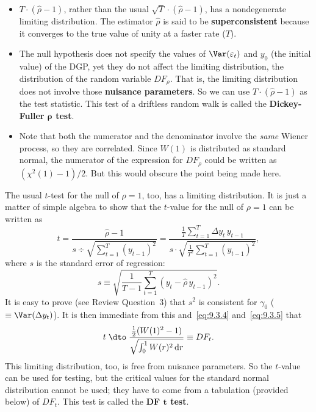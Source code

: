\begin{itemize}
\item $T \cdot (\hat{\rho} - 1)$, rather than the usual $\sqrt{T} \cdot (\hat{\rho} - 1)$, has a nondegenerate limiting
distribution. The estimator $\hat{\rho}$ is said to be \textbf{superconsistent} because it converges
to the true value of unity at a faster rate ($T$).

\item The null hypothesis does not specify the values of $\Var(\varepsilon_t)$ and $y_0$ (the initial
value) of the DGP, yet they do not affect the limiting distribution, the distribution
of the random variable $DF_\rho$. That is, the limiting distribution does not involve
those \textbf{nuisance parameters}. So we can use $T \cdot (\hat{\rho} - 1)$ as the test statistic. This
test of a driftless random walk is called the \textbf{Dickey-Fuller $\bm{\rho}$ test}.

\item Note that both the numerator and the denominator involve the \emph{same} Wiener
process, so they are correlated. Since $W(1)$ is distributed as standard normal,
the numerator of the expression for $DF_\rho$ could be written as $(\chi^2(1) - 1)/2$. But
this would obscure the point being made here.
\end{itemize}

The usual $t$-test for the null of $\rho = 1$, too, has a limiting distribution. It is just
a matter of simple algebra to show that the $t$-value for the null of $\rho = 1$ can be
written as
\begin{equation}
\label{eq:9.3.7}
t = \frac{\hat{\rho} - 1}{s \div \sqrt{\sum_{t=1}^{T} (y_{t-1})^2}}
= \frac{\frac{1}{T}\sum_{t=1}^{T} \Delta y_t\, y_{t-1}}{s \cdot \sqrt{\frac{1}{T^2}\sum_{t=1}^{T}(y_{t-1})^2}},
\end{equation}
where $s$ is the standard error of regression:
\begin{equation}
\label{eq:9.3.8}
s \equiv \sqrt{\frac{1}{T-1}\sum_{t=1}^{T}(y_t - \hat{\rho}\, y_{t-1})^2}.
\end{equation}
It is easy to prove (see Review Question~3) that $s^2$ is consistent for $\gamma_0$ ($\equiv \Var(\Delta y_t)$).
It is then immediate from this and~\eqref{eq:9.3.4} and~\eqref{eq:9.3.5} that
\begin{equation}
\label{eq:9.3.9}
t \;\dto\; \frac{\tfrac{1}{2}(W(1)^2 - 1)}{\sqrt{\int_0^1 W(r)^2\,\mathrm{d}r}}
\equiv DF_t.
\end{equation}
This limiting distribution, too, is free from nuisance parameters. So the $t$-value
can be used for testing, but the critical values for the standard normal distribution
cannot be used; they have to come from a tabulation (provided below) of $DF_t$. This
test is called the \textbf{DF $\bm{t}$ test}.

